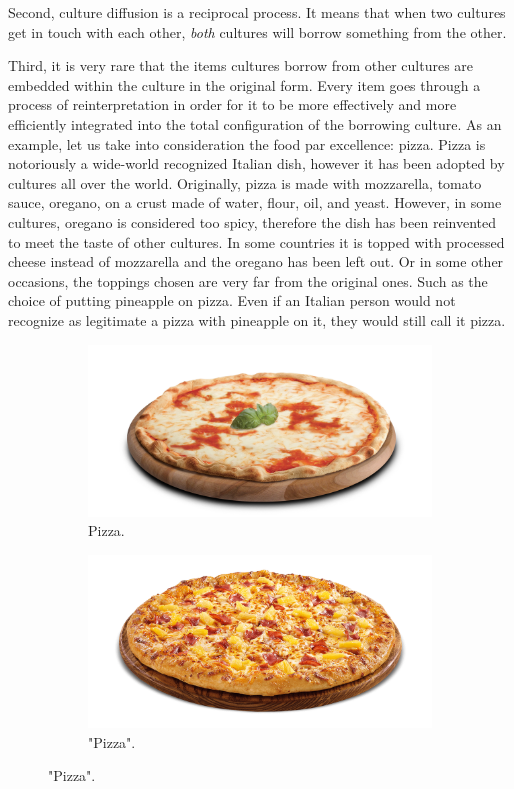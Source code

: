 \documentclass[../main.tex]{subfiles}
\begin{document}
Second, culture diffusion is a reciprocal process. It means that when two cultures get in touch with each other, \textit{both} cultures will borrow something from the other.

Third, it is very rare that the items cultures borrow from other cultures are embedded within the culture in the original form. Every item goes through a process of reinterpretation in order for it to be more effectively and more efficiently integrated into the total configuration of the borrowing culture. As an example, let us take into consideration the food par excellence: pizza. Pizza is notoriously a wide-world recognized Italian dish, however it has been adopted by cultures all over the world. Originally, pizza is made with mozzarella, tomato sauce, oregano, on a crust made of water, flour, oil, and yeast. However, in some cultures, oregano is considered too spicy, therefore the dish has been reinvented to meet the taste of other cultures. In some countries it is topped with processed cheese instead of mozzarella and the oregano has been left out. Or in some other occasions, the toppings chosen are very far from the original ones. Such as the choice of putting pineapple on pizza. Even if an Italian person would not recognize as legitimate a pizza with pineapple on it, they would still call it pizza.

\begin{figure}[h]
\centering
\begin{subfigure}{.5\textwidth}
  \centering
  \includegraphics[width=.53\linewidth]{images/margherita.png}
  \caption{Pizza.}
  \label{fig:sub1}
\end{subfigure}%
\begin{subfigure}{.5\textwidth}
  \centering
  \includegraphics[width=.5\linewidth]{images/hawaii.png}
  \caption{"Pizza".}
  \label{fig:sub2}
\end{subfigure}
\end{figure}
\end{document}
